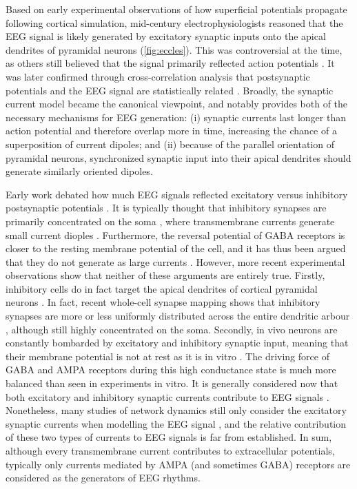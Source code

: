 Based on early experimental observations of how superficial potentials propagate following cortical simulation, mid-century electrophysiologists \cite{Eccles1951} reasoned that the EEG signal is likely generated by excitatory synaptic inputs onto the apical dendrites of pyramidal neurons (\autoref{fig:eccles}). This was controversial at the time, as others still believed that the signal primarily reflected action potentials \cite{Burns1950}. It was later confirmed through cross-correlation analysis that postsynaptic potentials and the EEG signal are statistically related \cite{KLEE1965}. Broadly, the synaptic current model became the canonical viewpoint, and notably provides both of the necessary mechanisms for EEG generation: (i) synaptic currents last longer than action potential and therefore overlap more in time, increasing the chance of a superposition of current dipoles; and (ii) because of the parallel orientation of pyramidal neurons, synchronized synaptic input into their apical dendrites should generate similarly oriented dipoles.

Early work debated how much EEG signals reflected excitatory versus inhibitory postsynaptic potentials \cite{Pollen1964,Creutzfeldt1966, Creutzfeldt1966a}. It is typically thought that inhibitory synapses are primarily concentrated on the soma \cite{Telenczuk2020, Mazzoni2015,Næss2021}, where transmembrane currents generate small current dioples \cite{Ahlfors2015}. Furthermore, the reversal potential of GABA receptors is closer to the resting membrane potential of the cell, and it has thus been argued that they do not generate as large currents \cite{Buzsaki2012}. However, more recent experimental observations show that neither of these arguments are entirely true. Firstly, inhibitory cells do in fact target the apical dendrites of cortical pyramidal neurons \cite{Palmer2012}. In fact, recent whole-cell synapse mapping shows that inhibitory synapses are more or less uniformly distributed across the entire dendritic arbour \cite{Iacaruso2017}, although still highly concentrated on the soma. Secondly, in vivo neurons are constantly bombarded by excitatory and inhibitory synaptic input, meaning that their membrane potential is not at rest as it is in vitro \cite{Destexhe2003}. The driving force of GABA and AMPA receptors during this high conductance state is much more balanced than seen in experiments in vitro. It is generally considered now that both excitatory and inhibitory synaptic currents contribute to EEG signals \cite{Buzsaki2012}. Nonetheless, many studies of network dynamics still only consider the excitatory synaptic currents when modelling the EEG signal \cite{Jensen2005,McCarthy2008}, and the relative contribution of these two types of currents to EEG signals is far from established. In sum, although every transmembrane current contributes to extracellular potentials, typically only currents mediated by AMPA (and sometimes GABA) receptors are considered as the generators of EEG rhythms.

